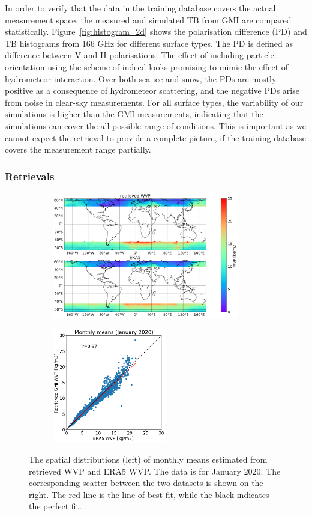 \documentclass[12pt,oneside,a4paper]{article}
\begin{document}
In order to verify that the data in the training database covers the actual measurement space, the measured and simulated TB from GMI are compared statistically. Figure~\ref{fig:histogram_2d} shows the polarisation difference (PD) and TB histograms from 166 GHz for different surface types. The PD is defined as difference between V and H polarisations. The effect of including particle orientation using the scheme of \citep{baralakas:intro:21} indeed looks promising to mimic the effect of hydrometeor interaction.
Over both sea-ice and snow, the PDs are mostly positive as a consequence of hydrometeor scattering, and the negative PDs arise from noise in clear-sky measurements. For all surface types, the variability of our simulations is higher than the GMI measurements, indicating that the simulations can cover the all possible range of conditions. This is important as we cannot expect the retrieval to provide a complete picture, if the training database covers the measurement range partially.

\subsubsection{Retrievals}

\begin{figure}[t]
	\centering
	\begin{subfigure}{.54\textwidth}
		\includegraphics[height = 55mm]{Figures/WVP_spatial_jan2020.png}
	\end{subfigure}
	\begin{subfigure}{.34\textwidth}
	\includegraphics[height = 50mm]{Figures/WVP_scatter_monthlymean.png} 
	\end{subfigure}
	\caption{The spatial distributions (left) of monthly means estimated from retrieved WVP and ERA5 WVP. The data is for January 2020. The corresponding scatter between the two datasets is shown on the right. The red line is the line of best fit, while the black indicates the perfect fit.}
\end{figure}
\end{document}
